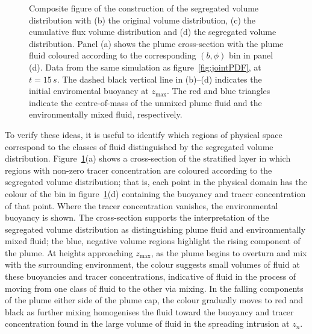 \documentclass[a4paper]{article}
\begin{document}
\begin{figure}
	\centering
	\caption{Composite figure of the construction of the segregated volume distribution with (b) the original
	volume distribution, (c) the cumulative flux volume distribution and (d) the segregated volume
	distribution. Panel (a) shows the plume cross-section with the plume fluid coloured according to the
	corresponding $(b, \phi)$ bin in panel (d).  Data from the same simulation as figure~\ref{fig:jointPDF},
	at $t = 15\, s$.  The dashed black vertical line in (b)--(d) indicates the initial enviromental buoyancy
	at $z_{\max}$. The red and blue triangles indicate the centre-of-mass of the unmixed plume fluid and the
	environmentally mixed fluid, respectively.}
	\label{fig:modPDF}
\end{figure}

To verify these ideas, it is useful to identify which regions of physical space correspond to
the classes of fluid distinguished by the segregated volume distribution. Figure~\ref{fig:modPDF}(a) shows a
cross-section of the stratified layer in which regions with non-zero tracer concentration are coloured
according to the segregated volume distribution; that is, each point in the physical domain has the colour of
the bin in figure~\ref{fig:modPDF}(d) containing the buoyancy and tracer concentration of that point. Where
the tracer concentration vanishes, the environmental buoyancy is shown. The cross-section supports the
interpretation of the segregated volume distribution as distinguishing plume fluid and environmentally mixed
fluid; the blue, negative volume regions highlight the rising component of the plume. At heights approaching
$z_{\max}$, as the plume begins to overturn and mix with the surrounding environment, the colour suggests
small volumes of fluid at these buoyancies and tracer concentrations, indicative of fluid in the process of
moving from one class of fluid to the other via mixing. In the falling components of the plume either side of
the plume cap, the colour gradually moves to red and black as further mixing homogenises the fluid toward the
buoyancy and tracer concentration found in the large volume of fluid in the spreading intrusion at $z_n$.  
\end{document}
